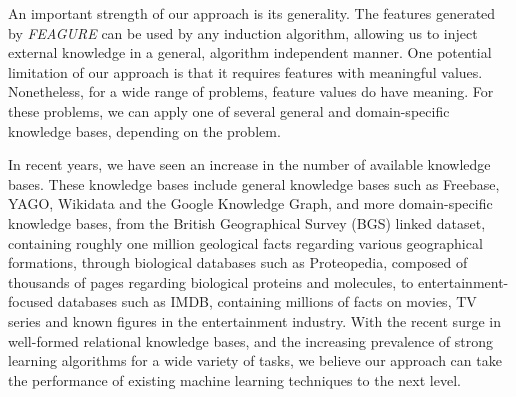 \documentclass[twoside,11pt]{article}
\theoremstyle{definition}
\begin{document}
An important strength of our approach is its generality. The features generated by \emph{FEAGURE} can be used by any induction algorithm, allowing us to inject external knowledge in a general, algorithm independent manner.
One potential limitation of our approach is that it requires features with meaningful values. Nonetheless, for a wide range of problems, feature values do have meaning. For these problems, we can apply one of several general and domain-specific knowledge bases, depending on the problem.

In recent years, we have seen an increase in the number of available knowledge bases. These knowledge bases include general knowledge bases such as Freebase, YAGO, Wikidata and the Google Knowledge Graph, and more domain-specific knowledge bases,  from the British Geographical Survey (BGS) linked dataset, containing roughly one million geological facts regarding various geographical formations, through biological databases such as Proteopedia, composed of thousands of pages regarding biological proteins and molecules, to entertainment-focused databases such as IMDB, containing millions of facts on movies, TV series and known figures in the entertainment industry. 
With the recent surge in well-formed relational knowledge bases,
and the increasing prevalence of strong learning algorithms for a wide variety of tasks,
we believe our approach can take the performance of existing machine learning techniques to the next level.

\clearpage
\vskip 0.2in


\end{document}
